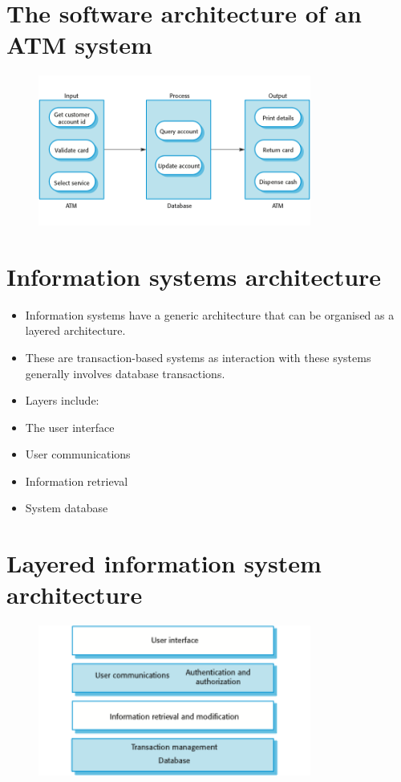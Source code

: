 \section{The software architecture of an ATM system}
\begin{figure}[h!]
    \centering
    \includegraphics[width = 0.8\textwidth]{./figures/L3_10.png}
    \caption{}
    \label{fig:L3_10}
\end{figure}


\section{Information systems architecture}
\begin{itemize}
\item Information systems have a generic architecture that can be organised as a layered architecture.

\item These are transaction-based systems as interaction with these systems generally involves database transactions.

\item Layers include:  \item The user interface  \item User communications  \item Information retrieval  \item System database

\end{itemize}
\section{Layered information system architecture}
\begin{figure}[h!]
    \centering
    \includegraphics[width = 0.8\textwidth]{./figures/L3_11.png}
    \caption{}
    \label{fig:L3_11}
\end{figure}

